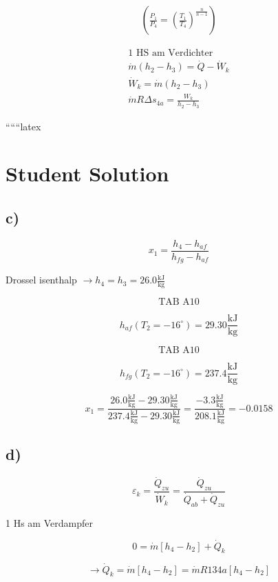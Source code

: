 \begin{align*}
    \left( 
    \frac{P_1}{P_4} = \left( \frac{T_1}{T_4} \right)^{\frac{n}{n-1}}
    \right)
\end{align*}

\begin{align*}
    1 \text{ HS am Verdichter} \\
    \dot{m} \left( h_2 - h_3 \right) = \dot{Q} - \dot{W}_k \\
    \dot{W}_k = \dot{m} \left( h_2 - h_3 \right) \\
    \dot{m} R \Delta s_{4a} = \frac{W_k}{h_2 - h_3}
\end{align*}

``````latex


\section*{Student Solution}

\subsection*{c)}

\[
x_1 = \frac{h_4 - h_{af}}{h_{fg} - h_{af}}
\]

Drossel isenthalp $\rightarrow h_4 = h_3 = 26.0 \frac{\text{kJ}}{\text{kg}}$

\[
\text{TAB A10}
\]

\[
h_{af}(T_2 = -16^\circ) = 29.30 \frac{\text{kJ}}{\text{kg}}
\]

\[
\text{TAB A10}
\]

\[
h_{fg}(T_2 = -16^\circ) = 237.4 \frac{\text{kJ}}{\text{kg}}
\]

\[
x_1 = \frac{26.0 \frac{\text{kJ}}{\text{kg}} - 29.30 \frac{\text{kJ}}{\text{kg}}}{237.4 \frac{\text{kJ}}{\text{kg}} - 29.30 \frac{\text{kJ}}{\text{kg}}} = \frac{-3.3 \frac{\text{kJ}}{\text{kg}}}{208.1 \frac{\text{kJ}}{\text{kg}}} = -0.0158
\]

\subsection*{d)}

\[
\varepsilon_k = \frac{\dot{Q}_{zu}}{\dot{W}_k} = \frac{\dot{Q}_{zu}}{\dot{Q}_{ab} + \dot{Q}_{zu}}
\]

1 Hs am Verdampfer

\[
0 = \dot{m} \left[ h_4 - h_2 \right] + \dot{Q}_k
\]

\[
\rightarrow \dot{Q}_k = \dot{m} \left[ h_4 - h_2 \right] = \dot{m} R134a \left[ h_4 - h_2 \right]
\]

